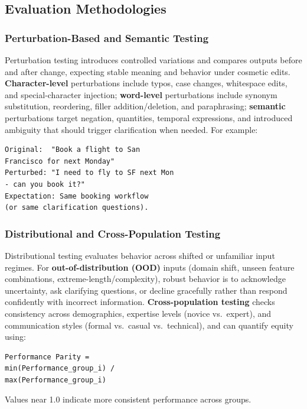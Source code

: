\begin{TNtwocol}
\subsection*{Evaluation Methodologies}

\subsubsection*{Perturbation-Based and Semantic Testing}
Perturbation testing introduces controlled variations and compares outputs before and after change, expecting stable meaning and behavior under cosmetic edits. \textbf{Character-level} perturbations include typos, case changes, whitespace edits, and special-character injection; \textbf{word-level} perturbations include synonym substitution, reordering, filler addition/deletion, and paraphrasing; \textbf{semantic} perturbations target negation, quantities, temporal expressions, and introduced ambiguity that should trigger clarification when needed. For example:
\begin{verbatim}
Original:  "Book a flight to San 
Francisco for next Monday"
Perturbed: "I need to fly to SF next Mon 
- can you book it?"
Expectation: Same booking workflow 
(or same clarification questions).
\end{verbatim}

\subsubsection*{Distributional and Cross-Population Testing}
Distributional testing evaluates behavior across shifted or unfamiliar input regimes. For \textbf{out-of-distribution (OOD)} inputs (domain shift, unseen feature combinations, extreme-length/complexity), robust behavior is to acknowledge uncertainty, ask clarifying questions, or decline gracefully rather than respond confidently with incorrect information. \textbf{Cross-population testing} checks consistency across demographics, expertise levels (novice vs.\ expert), and communication styles (formal vs.\ casual vs.\ technical), and can quantify equity using:
\begin{verbatim}
Performance Parity = 
min(Performance_group_i) / 
max(Performance_group_i)
\end{verbatim}
Values near 1.0 indicate more consistent performance across groups.


\end{TNtwocol}
